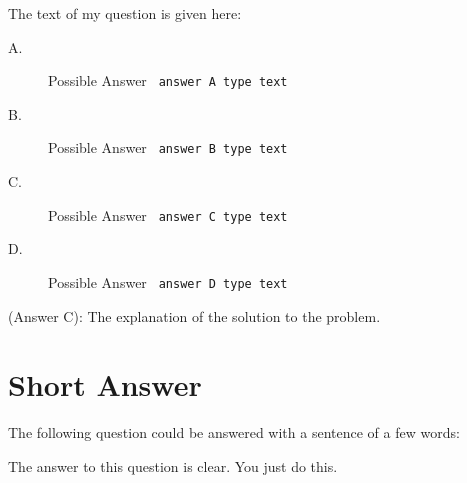 \documentclass[12pt,answers]{exam}
\begin{document}
\begin{questions}
\question The text of my question is given here:
\begin{description}
\item[A.] Possible Answer \verb' answer A type text'
\item[B.] Possible Answer \verb' answer B type text'
\item[C.] Possible Answer \verb' answer C type text'   
\item[D.] Possible Answer \verb' answer D type text'     
\end{description}
\begin{solution}
(Answer C): The explanation of the solution to the problem.  
\end{solution}

\end{questions}
\section*{Short Answer}
The following question could be answered with a sentence of a few words:
\begin{solution}
The answer to this question is clear. You just do this. 
\end{solution}
\end{document}

